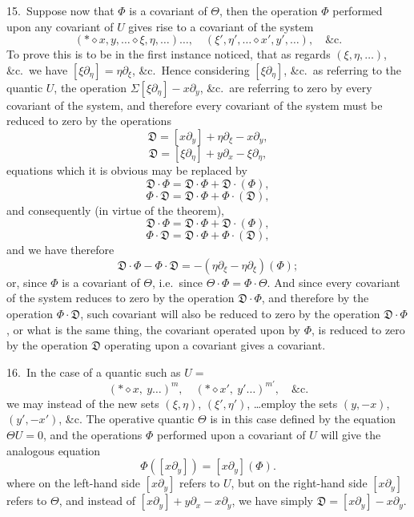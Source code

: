 \documentclass[11pt,a4paper]{article}
\begin{document}
15.\ Suppose now that $\Phi$ is a covariant of $\Theta$, then the operation $\Phi$ performed upon any covariant of $U$ gives rise to a covariant of the system
\[
(*\diamond x, y, \ldots\diamond \xi, \eta, \ldots)\ldots, \quad(\xi', \eta', \ldots\diamond x', y', \ldots),\quad\&\mathrm{c}.
\]
To prove this is to be in the first instance noticed, that as regards $(\xi, \eta, \ldots)$, \&c.\ we have $[\xi\partial_\eta] = \eta\partial_\xi$, \&c.\ Hence considering $[\xi\partial_\eta]$, \&c.\ as referring to the quantic $U$, the operation $\Sigma[\xi\partial_\eta] - x\partial_y$, \&c.\ are referring to zero by every covariant of the system, and therefore every covariant of the system must be reduced to zero by the operations
\[
\mathfrak{D} = [x\partial_y] + \eta\partial_\xi - x\partial_y,
\]
\[
\mathfrak{D} = [\xi\partial_\eta] + y\partial_x - \xi\partial_\eta,
\]
equations which it is obvious may be replaced by
\[
\mathfrak{D}\cdot\Phi = \mathfrak{D}\cdot\Phi + \mathfrak{D}\cdot(\Phi),
\]
\[
\Phi\cdot\mathfrak{D} = \mathfrak{D}\cdot\Phi + \Phi\cdot(\mathfrak{D}),
\]
and consequently (in virtue of the theorem),
\[
\mathfrak{D}\cdot\Phi = \mathfrak{D}\cdot\Phi + \mathfrak{D}\cdot(\Phi),
\]
\[
\Phi\cdot\mathfrak{D} = \mathfrak{D}\cdot\Phi + \Phi\cdot(\mathfrak{D}),
\]
and we have therefore
\[
\mathfrak{D}\cdot\Phi - \Phi\cdot\mathfrak{D} = -(\eta\partial_\xi - \eta\partial_\xi)(\Phi);
\]
or, since $\Phi$ is a covariant of $\Theta$, i.e.\ since $\Theta\cdot\Phi = \Phi\cdot\Theta$. And since every covariant of the system reduces to zero by the operation $\mathfrak{D}\cdot\Phi$, and therefore by the operation $\Phi\cdot\mathfrak{D}$, such covariant will also be reduced to zero by the operation $\mathfrak{D}\cdot\Phi$, or what is the same thing, the covariant operated upon by $\Phi$, is reduced to zero by the operation $\mathfrak{D}$ operating upon a covariant gives a covariant.

\medskip

16.\ In the case of a quantic such as $U =$
\[
(*\diamond x,\ y\ldots)^m,\quad (*\diamond x',\ y'\ldots)^{m'},\quad\&\mathrm{c}.
\]
we may instead of the new sets $(\xi,\eta)$, $(\xi',\eta')$, \ldots employ the sets $(y, -x)$, $(y', -x')$, \&c. The operative quantic $\Theta$ is in this case defined by the equation $\Theta U = 0$, and the operations $\Phi$ performed upon a covariant of $U$ will give the analogous equation
\[
\Phi([x\partial_y]) = [x\partial_y](\Phi).
\]
where on the left-hand side $[x\partial_y]$ refers to $U$, but on the right-hand side $[x\partial_y]$ refers to $\Theta$, and instead of $[x\partial_y] + y\partial_x - x\partial_y$, we have simply $\mathfrak{D} = [x\partial_y] - x\partial_y$.
\end{document}
